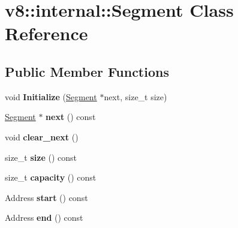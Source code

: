 \hypertarget{classv8_1_1internal_1_1_segment}{}\section{v8\+:\+:internal\+:\+:Segment Class Reference}
\label{classv8_1_1internal_1_1_segment}
\subsection*{Public Member Functions}
\begin{DoxyCompactItemize}
\item 
void {\bfseries Initialize} (\hyperlink{classv8_1_1internal_1_1_segment}{Segment} $\ast$next, size\+\_\+t size)\hypertarget{classv8_1_1internal_1_1_segment_a19635e0651a6baebbd0d7f29ab1b321c}{}\label{classv8_1_1internal_1_1_segment_a19635e0651a6baebbd0d7f29ab1b321c}

\item 
\hyperlink{classv8_1_1internal_1_1_segment}{Segment} $\ast$ {\bfseries next} () const \hypertarget{classv8_1_1internal_1_1_segment_a0aefcd7c631b87c17b8428d10bc408ab}{}\label{classv8_1_1internal_1_1_segment_a0aefcd7c631b87c17b8428d10bc408ab}

\item 
void {\bfseries clear\+\_\+next} ()\hypertarget{classv8_1_1internal_1_1_segment_a63bf9c645acafb2b921ba3c5e8ac9213}{}\label{classv8_1_1internal_1_1_segment_a63bf9c645acafb2b921ba3c5e8ac9213}

\item 
size\+\_\+t {\bfseries size} () const \hypertarget{classv8_1_1internal_1_1_segment_a8da8b667c812532de9defccd60e99fbf}{}\label{classv8_1_1internal_1_1_segment_a8da8b667c812532de9defccd60e99fbf}

\item 
size\+\_\+t {\bfseries capacity} () const \hypertarget{classv8_1_1internal_1_1_segment_a6989878d7be376bfafdd734b4bc31425}{}\label{classv8_1_1internal_1_1_segment_a6989878d7be376bfafdd734b4bc31425}

\item 
Address {\bfseries start} () const \hypertarget{classv8_1_1internal_1_1_segment_abbaaa544cff0d9869cab5fbc3bf0e803}{}\label{classv8_1_1internal_1_1_segment_abbaaa544cff0d9869cab5fbc3bf0e803}

\item 
Address {\bfseries end} () const \hypertarget{classv8_1_1internal_1_1_segment_ae3d423ce6c83233af0f81b80fd5f226a}{}\label{classv8_1_1internal_1_1_segment_ae3d423ce6c83233af0f81b80fd5f226a}

\end{DoxyCompactItemize}
